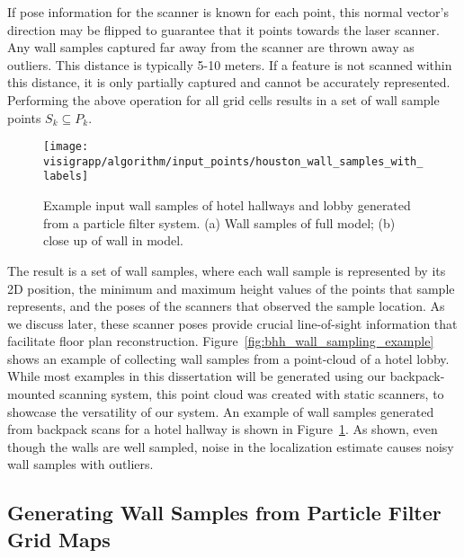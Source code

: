 \documentclass[12pt,onecolumn,oneside]{book}
\begin{document}
If pose information for the scanner is known for each point, this normal vector's direction may be flipped to guarantee that it points towards the laser scanner.  Any wall samples captured far away from the scanner are thrown away as outliers.  This distance is typically 5-10 meters.  If a feature is not scanned within this distance, it is only partially captured and cannot be accurately represented. Performing the above operation for all grid cells results in a set of wall sample points $S_k \subseteq P_k$.  

\begin{figure}
  \centering
  \texttt{[image: visigrapp/algorithm/input\_points/houston\_wall\_samples\_with\_labels]}
  \caption[Wall samples from backpack point cloud.]{Example input wall samples of hotel hallways and lobby generated from a particle filter system. (a) Wall samples of full model; (b) close up of wall in model.}
  \label{fig:backpack_wall_sample_example}
\end{figure}

The result is a set of wall samples, where each wall sample is represented by its 2D position, the minimum and maximum height values of the points that sample represents, and the poses of the scanners that observed the sample location.  As we discuss later, these scanner poses provide crucial line-of-sight information that facilitate floor plan reconstruction.  Figure~\ref{fig:bhh_wall_sampling_example} shows an example of collecting wall samples from a point-cloud of a hotel lobby.  While most examples in this dissertation will be generated using our backpack-mounted scanning system, this point cloud was created with static scanners, to showcase the versatility of our system. An example of wall samples generated from backpack scans for a hotel hallway is shown in Figure~\ref{fig:backpack_wall_sample_example}.  As shown, even though the walls are well sampled, noise in the localization estimate causes noisy wall samples with outliers.

\subsection{Generating Wall Samples from Particle Filter Grid Maps}
\label{ssec:ws_from_pf}
\end{document}
